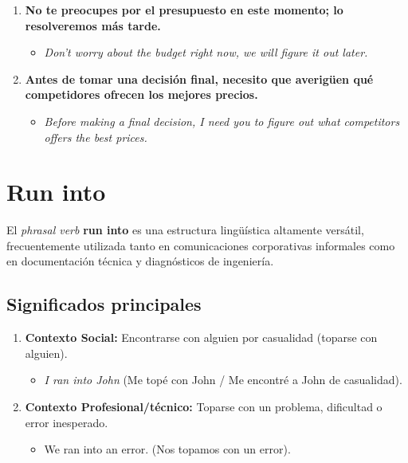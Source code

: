 \documentclass[
10pt, %
a4paper, %
oneside, %
headinclude,footinclude, %
BCOR5mm, %
]{scrartcl}
\begin{document}
\begin{enumerate}
	\begin{itemize}
		\item \textit{I just figured out how to reduce the memory consumption in our web app.}
	\end{itemize}
	\item \textbf{No te preocupes por el presupuesto en este momento; lo resolveremos más tarde.}
	\begin{itemize}
		\item \textit{Don't worry about the budget right now, we will figure it out later.}
	\end{itemize}
	\item \textbf{Antes de tomar una decisión final, necesito que averigüen qué competidores ofrecen los mejores precios.}
	\begin{itemize}
	\item \textit{Before making a final decision, I need you to figure out what competitors offers the best prices.}
	\end{itemize}
\end{enumerate}

\newpage

\section{Run into}
El \textit{phrasal verb} \textbf{run into} es una estructura lingüística altamente versátil, frecuentemente utilizada tanto en comunicaciones corporativas informales como en documentación técnica y diagnósticos de ingeniería.

\subsection{Significados principales}
\begin{enumerate}
	\item \textbf{Contexto Social:} Encontrarse con alguien por casualidad (toparse con alguien).
	\begin{itemize}
		\item \textit{I ran into John} (Me topé con John / Me encontré a John de casualidad).
	\end{itemize}
	\item \textbf{Contexto Profesional/técnico:} Toparse con un problema, dificultad o error inesperado.
	\begin{itemize}
		\item We ran into an error. (Nos topamos con un error).
	\end{itemize}
\end{enumerate}
\end{document}
